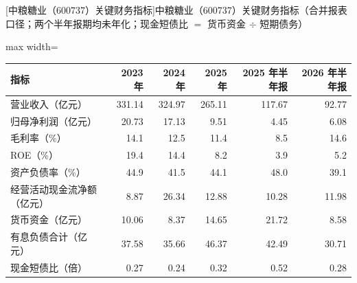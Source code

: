 \begin{center}\small\setlength{\tabcolsep}{3.4pt}
[中粮糖业（600737）关键财务指标]{中粮糖业（600737）关键财务指标（合并报表口径；两个半年报期均未年化；现金短债比 $=$ 货币资金 $\div$ 短期债务）}
\begin{adjustbox}{max width=\textwidth}
\begin{tabular}{@{}lrrrrr@{}}
\toprule
指标 & 2023 年 & 2024 年 & 2025 年 & 2025 年半年报 & 2026 年半年报 \\
\midrule
营业收入（亿元） & 331.14 & 324.97 & 265.11 & 117.67 & 92.77 \\
归母净利润（亿元） & 20.73 & 17.13 & 9.51 & 4.45 & 6.08 \\
毛利率（\%） & 14.1 & 12.5 & 11.4 & 8.5 & 14.6 \\
ROE（\%） & 19.4 & 14.4 & 8.2 & 3.9 & 5.2 \\
资产负债率（\%） & 44.9 & 41.5 & 44.1 & 48.0 & 39.1 \\
经营活动现金流净额（亿元） & 8.87 & 26.34 & 12.88 & 10.28 & 11.98 \\
货币资金（亿元） & 10.06 & 8.37 & 14.65 & 21.72 & 8.58 \\
有息负债合计（亿元） & 37.58 & 35.66 & 46.37 & 42.49 & 30.71 \\
现金短债比（倍） & 0.27 & 0.24 & 0.32 & 0.52 & 0.28 \\
\bottomrule
\end{tabular}
\end{adjustbox}
\end{center}

